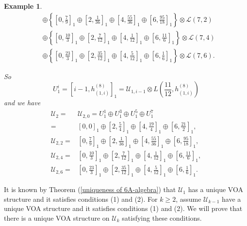 \documentclass{article}
\newtheorem{example}[lemma]{Example}
\begin{document}
\begin{example}
\begin{equation*}
\begin{aligned}
&\oplus\left\{\left[0,\frac{7}{9}\right]_1\oplus\left[2,\frac{1}{36}\right]_1\oplus\left[4,\frac{55}{36}\right]_1\oplus\left[6,\frac{95}{18}\right]_1\right\}\otimes\mathcal{L}\left(7,2\right)\\
&\oplus\left\{\left[0,\frac{10}{3}\right]_1\oplus\left[2,\frac{7}{12}\right]_1\oplus\left[4,\frac{1}{12}\right]_1\oplus\left[6,\frac{11}{6}\right]_1\right\}\otimes\mathcal{L}\left(7,4\right)\\
&\oplus\left\{\left[0,\frac{23}{3}\right]_1\oplus\left[2,\frac{35}{12}\right]_1\oplus\left[4,\frac{5}{12}\right]_1\oplus\left[6,\frac{1}{6}\right]_1\right\}\otimes\mathcal{L}\left(7,6\right).
\end{aligned}
\end{equation*}

So
$$U_1^{i}=\left[i-1,h_{(1,i)}^{(8)}\right]_1=\mathcal{U}_{1,i-1}\otimes L\left(\frac{11}{12},h_{(1,i)}^{(8)}\right)$$
and we have
$$
\begin{aligned}
\mathcal{U}_{2}=&\mathcal{U}_{2,0}=U_1^1\oplus U_1^3\oplus U_1^5\oplus U_1^7
\\= &\left[0,0\right]_1
\oplus\left[2,\frac{5}{4}\right]_1\oplus\left[4,\frac{19}{4}\right]_1\oplus\left[6,\frac{21}{2}\right]_1,\\
\mathcal{U}_{2,2}=&\left[0,\frac{7}{9}\right]_1\oplus\left[2,\frac{1}{36}\right]_1\oplus\left[4,\frac{55}{36}\right]_1\oplus\left[6,\frac{95}{18}\right]_1,\\
\mathcal{U}_{2,4}=&\left[0,\frac{10}{3}\right]_1\oplus\left[2,\frac{7}{12}\right]_1\oplus\left[4,\frac{1}{12}\right]_1\oplus\left[6,\frac{11}{6}\right]_1,\\
\mathcal{U}_{2,6}=&\left[0,\frac{23}{3}\right]_1\oplus\left[2,\frac{35}{12}\right]_1\oplus\left[4,\frac{5}{12}\right]_1\oplus\left[6,\frac{1}{6}\right]_1.
\end{aligned}
$$
\end{example}


It is known by Theorem (\ref{uniqueness of 6A-algebra}) that $\mathcal{U}_{1}$ has a unique VOA structure and it satisfies conditions (1) and (2).
For $k\geq 2$, assume $\mathcal{U}_{k-1}$ have a unique VOA structure
and it satisfies conditions (1) and (2).
We will prove that there is a unique VOA structure on $\mathcal{U}_k$ satisfying these conditions.
\end{document}
